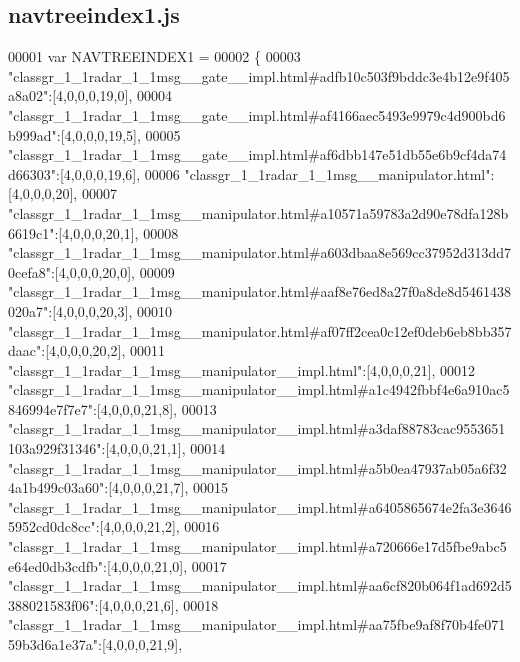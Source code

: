 \subsection{navtreeindex1.\+js}
\label{navtreeindex1_8js_source}

\begin{DoxyCode}
00001 var NAVTREEINDEX1 =
00002 \{
00003 \textcolor{stringliteral}{"classgr\_1\_1radar\_1\_1msg\_\_gate\_\_impl.html#adfb10c503f9bddc3e4b12e9f405a8a02"}:[4,0,0,0,19,0],
00004 \textcolor{stringliteral}{"classgr\_1\_1radar\_1\_1msg\_\_gate\_\_impl.html#af4166aec5493e9979c4d900bd6b999ad"}:[4,0,0,0,19,5],
00005 \textcolor{stringliteral}{"classgr\_1\_1radar\_1\_1msg\_\_gate\_\_impl.html#af6dbb147e51db55e6b9cf4da74d66303"}:[4,0,0,0,19,6],
00006 \textcolor{stringliteral}{"classgr\_1\_1radar\_1\_1msg\_\_manipulator.html"}:[4,0,0,0,20],
00007 \textcolor{stringliteral}{"classgr\_1\_1radar\_1\_1msg\_\_manipulator.html#a10571a59783a2d90e78dfa128b6619c1"}:[4,0,0,0,20,1],
00008 \textcolor{stringliteral}{"classgr\_1\_1radar\_1\_1msg\_\_manipulator.html#a603dbaa8e569cc37952d313dd70cefa8"}:[4,0,0,0,20,0],
00009 \textcolor{stringliteral}{"classgr\_1\_1radar\_1\_1msg\_\_manipulator.html#aaf8e76ed8a27f0a8de8d5461438020a7"}:[4,0,0,0,20,3],
00010 \textcolor{stringliteral}{"classgr\_1\_1radar\_1\_1msg\_\_manipulator.html#af07ff2cea0c12ef0deb6eb8bb357daac"}:[4,0,0,0,20,2],
00011 \textcolor{stringliteral}{"classgr\_1\_1radar\_1\_1msg\_\_manipulator\_\_impl.html"}:[4,0,0,0,21],
00012 \textcolor{stringliteral}{"classgr\_1\_1radar\_1\_1msg\_\_manipulator\_\_impl.html#a1c4942fbbf4e6a910ac5846994e7f7e7"}:[4,0,0,0,21,8],
00013 \textcolor{stringliteral}{"classgr\_1\_1radar\_1\_1msg\_\_manipulator\_\_impl.html#a3daf88783cac9553651103a929f31346"}:[4,0,0,0,21,1],
00014 \textcolor{stringliteral}{"classgr\_1\_1radar\_1\_1msg\_\_manipulator\_\_impl.html#a5b0ea47937ab05a6f324a1b499c03a60"}:[4,0,0,0,21,7],
00015 \textcolor{stringliteral}{"classgr\_1\_1radar\_1\_1msg\_\_manipulator\_\_impl.html#a6405865674e2fa3e36465952cd0dc8cc"}:[4,0,0,0,21,2],
00016 \textcolor{stringliteral}{"classgr\_1\_1radar\_1\_1msg\_\_manipulator\_\_impl.html#a720666e17d5fbe9abc5e64ed0db3cdfb"}:[4,0,0,0,21,0],
00017 \textcolor{stringliteral}{"classgr\_1\_1radar\_1\_1msg\_\_manipulator\_\_impl.html#aa6cf820b064f1ad692d5388021583f06"}:[4,0,0,0,21,6],
00018 \textcolor{stringliteral}{"classgr\_1\_1radar\_1\_1msg\_\_manipulator\_\_impl.html#aa75fbe9af8f70b4fe07159b3d6a1e37a"}:[4,0,0,0,21,9],

\end{DoxyCode}
